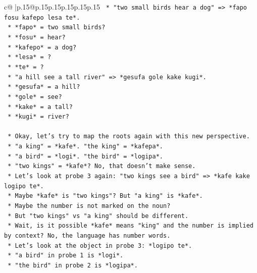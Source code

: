 \documentclass{article}
\begin{document}
{\begin{supertabular}{c@{$\;$}|p{.15\linewidth}@{}p{.15\linewidth}p{.15\linewidth}p{.15\linewidth}p{.15\linewidth}p{.15\linewidth}}
{{{\texttt{                *   "two small birds hear a dog" => *fapo fosu kafepo lesa te*.} \\
\texttt{                    *   *fapo* = two small birds?} \\
\texttt{                    *   *fosu* = hear?} \\
\texttt{                    *   *kafepo* = a dog?} \\
\texttt{                    *   *lesa* = ?} \\
\texttt{                    *   *te* = ?} \\
\texttt{                *   "a hill see a tall river" => *gesufa gole kake kugi*.} \\
\texttt{                    *   *gesufa* = a hill?} \\
\texttt{                    *   *gole* = see?} \\
\texttt{                    *   *kake* = a tall?} \\
\texttt{                    *   *kugi* = river?} \\
\\ 
\texttt{            *   Okay, let's try to map the roots again with this new perspective.} \\
\texttt{            *   "a king" = *kafe*. "the king" = *kafepa*.} \\
\texttt{            *   "a bird" = *logi*. "the bird" = *logipa*.} \\
\texttt{            *   "two kings" = *kafe*? No, that doesn't make sense.} \\
\texttt{            *   Let's look at probe 3 again: "two kings see a bird" => *kafe kake logipo te*.} \\
\texttt{                *   Maybe *kafe* is "two kings"? But "a king" is *kafe*.} \\
\texttt{                *   Maybe the number is not marked on the noun?} \\
\texttt{                *   But "two kings" vs "a king" should be different.} \\
\texttt{                *   Wait, is it possible *kafe* means "king" and the number is implied by context? No, the language has number words.} \\
\texttt{                *   Let's look at the object in probe 3: *logipo te*.} \\
\texttt{                *   "a bird" in probe 1 is *logi*.} \\
\texttt{                *   "the bird" in probe 2 is *logipa*.} \\
}}}
\end{supertabular}}
\end{document}
